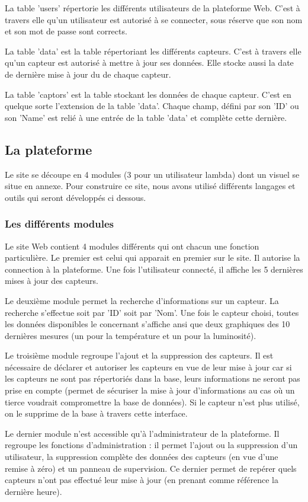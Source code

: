 	\par
	La table 'users' répertorie les différents utilisateurs de la plateforme Web. C'est à travers elle qu'un utilisateur est autorisé à se connecter, sous réserve que son nom et son mot de passe sont corrects.
	\par
	La table 'data' est la table répertoriant les différents capteurs. C'est à travers elle qu'un capteur est autorisé à mettre à jour ses données. Elle stocke aussi la date de dernière mise à jour du de chaque capteur.
	\par
	La table 'captors' est la table stockant les données de chaque capteur. C'est en quelque sorte l'extension de la table 'data'. Chaque champ, défini par son 'ID' ou son 'Name' est relié à une entrée de la table 'data' et complète cette dernière.
	\subsection{La plateforme}
	\par
	Le site se découpe en 4 modules (3 pour un utilisateur lambda) dont un visuel se situe en annexe.
	Pour construire ce site, nous avons utilisé différents langages et outils qui seront développés ci dessous.
	\subsubsection{Les différents modules}
	\par
	Le site Web contient 4 modules différents qui ont chacun une fonction particulière. Le premier est celui qui apparait en premier sur le site. Il autorise la connection à la plateforme. Une fois l'utilisateur connecté, il affiche les 5 dernières mises à jour des capteurs.
	\par
	Le deuxième module permet la recherche d'informations sur un capteur. La recherche s'effectue soit par 'ID' soit par 'Nom'. Une fois le capteur choisi, toutes les données disponibles le concernant s'affiche ansi que deux graphiques des 10 dernières mesures (un pour la température et un pour la luminosité).
	\par
	Le troisième module regroupe l'ajout et la suppression des capteurs. Il est nécessaire de déclarer et autoriser les capteurs en vue de leur mise à jour car si les capteurs ne sont pas répertoriés dans la base, leurs informations ne seront pas prise en compte (permet de sécuriser la mise à jour d'informations au cas où un tierce voudrait compromettre la base de données). Si le capteur n'est plus utilisé, on le supprime de la base à travers cette interface.
	\par
	Le dernier module n'est accessible qu'à l'administrateur de la plateforme. Il regroupe les fonctions d'administration : il permet l'ajout ou la suppression d'un utilisateur, la suppression complète des données des capteurs (en vue d'une remise à zéro) et un panneau de supervision. Ce dernier permet de repérer quels capteurs n'ont pas effectué leur mise à jour (en prenant comme référence la dernière heure). 
